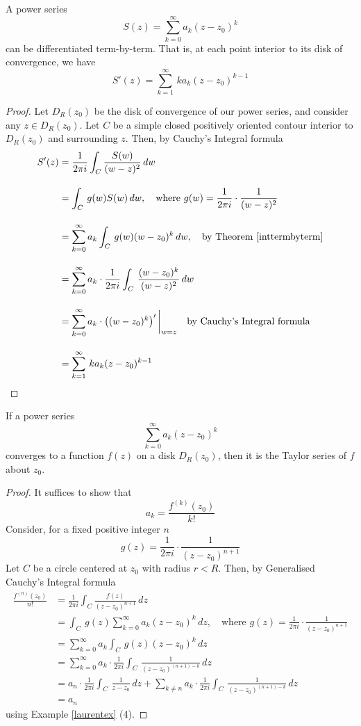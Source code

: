 \vspace*{1em}

\begin{theorem}\label{diftermbyterm}
A power series 
\[S(z) = \sum_{k=0}^\infty a_k(z - z_0)^k\]
can be differentiated term-by-term. That is, at each point interior to its disk of convergence, we have
\[S'(z) = \sum_{k=1}^\infty\,ka_k(z - z_0)^{k-1}\]
\end{theorem}
\begin{proof}
Let $D_R(z_0)$ be the disk of convergence of our power series, and consider any $z \in D_R(z_0)$. Let $C$ be a simple closed positively oriented contour interior to $D_R(z_0)$ and surrounding $z$. Then, by Cauchy's Integral formula
\begin{align*}
S'(z) &= \frac{1}{2\pi i}\int_C\frac{S(w)}{(w - z)^2}\,dw\\[1em]
 &= \int_C\,g(w)S(w)\,dw,\quad \text{where }g(w) = \frac{1}{2\pi i}\cdot\frac{1}{(w-z)^2}\\[1em]
 &= \sum_{k=0}^\infty a_k\int_C\,g(w)(w - z_0)^k\,dw,\quad \text{by Theorem \ref{inttermbyterm}}\\[1em]
 &= \sum_{k=0}^\infty a_k\cdot \frac{1}{2\pi i}\int_C\,\frac{(w - z_0)^k}{(w - z)^2}\,dw\\[1em]
 &= \sum_{k=0}^\infty a_k\cdot \left((w - z_0)^k\right)'\bigg\vert_{w = z}\quad \text{by Cauchy's Integral formula}\\[1em]
 &= \sum_{k=1}^\infty\,ka_k(z - z_0)^{k-1}
\end{align*}
\end{proof}

\vspace*{1em}

\begin{theorem}\label{taylorunique}
If a power series
\[\sum_{k=0}^\infty a_k(z - z_0)^k\]
converges to a function $f(z)$ on a disk $D_R(z_0)$, then it is the Taylor series of $f$ about $z_0$.
\end{theorem}
\begin{proof}
It suffices to show that
\[a_k = \frac{f^{(k)}(z_0)}{k!}\]
Consider, for a fixed positive integer $n$
\[g(z) = \frac{1}{2\pi i}\cdot \frac{1}{(z - z_0)^{n+1}}\]
Let $C$ be a circle centered at $z_0$ with radius $r < R$. Then, by Generalised Cauchy's Integral formula
\begin{align*}
\frac{f^{(n)}(z_0)}{n!} &= \frac{1}{2\pi i}\int_C\frac{f(z)}{(z - z_0)^{n+1}}\,dz\\[1em]
 &= \int_C\,g(z)\sum_{k=0}^\infty a_k(z - z_0)^k\,dz,\quad \text{where }g(z) = \frac{1}{2\pi i}\cdot\frac{1}{(z-z_0)^{n+1}}\\[1em]
 &= \sum_{k=0}^\infty a_k\int_C\,g(z)(z - z_0)^k\,dz\\[1em]
 &= \sum_{k=0}^\infty a_k\cdot \frac{1}{2\pi i}\int_C\,\frac{1}{(z - z_0)^{(n+1)-k}}\,dz\\[1em]
 &= a_n\cdot \frac{1}{2\pi i}\int_C\,\frac{1}{z - z_0}\,dz + \sum_{k\neq n} a_k\cdot \frac{1}{2\pi i}\int_C\,\frac{1}{(z - z_0)^{(n+1)-k}}\,dz\\[1em]
 &= a_n
\end{align*}
using Example \ref{laurentex} (4).
\end{proof}

